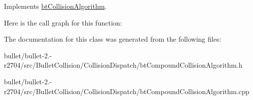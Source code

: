 Implements \hyperlink{classbt_collision_algorithm}{bt\+Collision\+Algorithm}.



Here is the call graph for this function\+:




The documentation for this class was generated from the following files\+:\begin{DoxyCompactItemize}
\item 
bullet/bullet-\/2.-\/r2704/src/\+Bullet\+Collision/\+Collision\+Dispatch/bt\+Compound\+Collision\+Algorithm.\+h\item 
bullet/bullet-\/2.-\/r2704/src/\+Bullet\+Collision/\+Collision\+Dispatch/bt\+Compound\+Collision\+Algorithm.\+cpp\end{DoxyCompactItemize}

